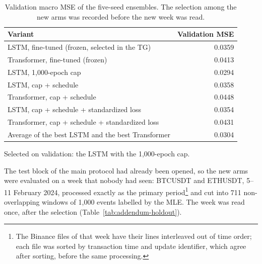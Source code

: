 \begin{table}[htbp]
\centering
\caption{Validation macro MSE of the five-seed ensembles. The selection among the new arms
was recorded before the new week was read.}
\label{tab:addendum-validation}
\small
\begin{tabular}{lr}
\toprule
Variant & Validation MSE \\
\midrule
LSTM, fine-tuned (frozen, selected in the TG) & 0.0359 \\
Transformer, fine-tuned (frozen) & 0.0413 \\
LSTM, 1,000-epoch cap & 0.0294 \\
LSTM, cap + schedule & 0.0358 \\
Transformer, cap + schedule & 0.0448 \\
LSTM, cap + schedule + standardized loss & 0.0354 \\
Transformer, cap + schedule + standardized loss & 0.0431 \\
Average of the best LSTM and the best Transformer & 0.0304 \\
\bottomrule
\end{tabular}
\end{table}

Selected on validation: the LSTM with the 1,000-epoch cap.


\label{sec:addendum-holdout}

The test block of the main protocol had already been opened, so the new arms were evaluated
on a week that nobody had seen: BTCUSDT and ETHUSDT, 5--11 February 2024, processed exactly
as the primary period\footnote{The Binance files of that week have their lines interleaved
out of time order; each file was sorted by transaction time and update identifier, which
agree after sorting, before the same processing.} and cut into
711 non-overlapping windows of 1,000 events labelled by the MLE. The week was
read once, after the selection (Table~\ref{tab:addendum-holdout}).

